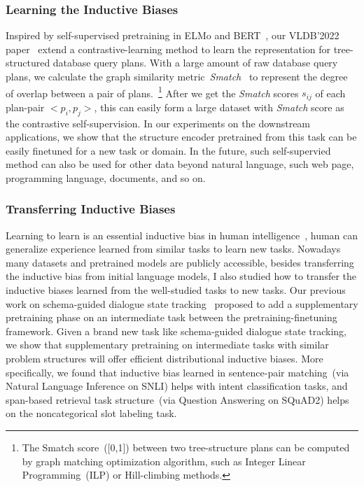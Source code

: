 \subsubsection{Learning the Inductive Biases}
\label{sssec:future:learn-biases}
Inspired by self-supervised pretraining in ELMo and
BERT~\cite{devlin2019bert}, our VLDB'2022
paper~\cite{paul2021database} extend a contrastive-learning method to
learn the representation for tree-structured database query
plans. With a large amount of raw database query plans, we calculate
the graph similarity metric~{\em Smatch}~\cite{Cai:2013wn} to
represent the degree of overlap between a pair of plans.~\footnote{The
  Smatch score~([0,1]) between two tree-structure plans can be
  computed by graph matching optimization algorithm, such as Integer
  Linear Programming~(ILP) or Hill-climbing methods.}  After we get
the {\em Smatch} scores $s_{ij}$ of each plan-pair $<p_{i}, p_{j}>$,
this can easily form a large dataset with {\em Smatch} score as the
contrastive self-supervision. In our experiments on the downstream
applications, we show that the structure encoder pretrained from this
task can be easily finetuned for a new task or domain. In the future,
such self-supervied method can also be used for other data beyond
natural language, such web page, programming language, documents, and
so on.

\subsubsection{Transferring Inductive Biases}
\label{sssec:future:transfer-biases}
Learning to learn is an essential inductive bias in human
intelligence~\cite{harlow1949formation}, human can generalize
experience learned from similar tasks to learn new tasks. Nowadays
many datasets and pretrained models are publicly accessible, besides
transferring the inductive bias from initial language models, I also
studied how to transfer the inductive biases learned from the
well-studied tasks to new tasks. Our previous work on schema-guided
dialogue state tracking~\cite{cao2021schema} proposed to add a
supplementary pretraining phase on an intermediate task between the
pretraining-finetuning framework. Given a brand new task like
schema-guided dialogue state tracking, we show that supplementary
pretraining on intermediate tasks with similar problem structures will
offer efficient distributional inductive biases. More specifically, we
found that inductive bias learned in sentence-pair matching~(via
Natural Language Inference on SNLI) helps with intent classification
tasks, and span-based retrieval task structure~(via Question Answering
on SQuAD2) helps on the noncategorical slot labeling task.


